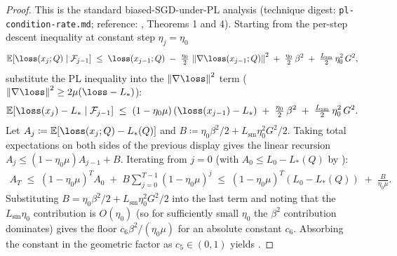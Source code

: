 \begin{proof}
This is the standard biased-SGD-under-PL analysis (technique digest:
\texttt{pl-condition-rate.md}; reference: \cite{karimi2016pl},
Theorems 1 and 4). Starting from the per-step descent inequality
 at constant step $\eta_j = \eta_0$
\begin{align*}
   \E[\loss(x_j; Q) \mid \mathcal F_{j-1}]
   \;\le\;
   \loss(x_{j-1}; Q) \;-\; \tfrac{\eta_0}{2}\, \norm{\nabla \loss(x_{j-1}; Q)}^2
   \;+\; \tfrac{\eta_0}{2}\, \beta^2
   \;+\; \tfrac{L_{\mathrm{sm}}}{2}\, \eta_0^2\, G^2,
\end{align*}
substitute the PL inequality  into the
$\norm{\nabla \loss}^2$ term ($\norm{\nabla \loss}^2 \ge 2 \mu (\loss - L_*)$):
\begin{align*}
   \E[\loss(x_j) - L_* \mid \mathcal F_{j-1}]
   \;\le\;
   (1 - \eta_0 \mu)\, (\loss(x_{j-1}) - L_*)
   \;+\; \tfrac{\eta_0}{2}\, \beta^2
   \;+\; \tfrac{L_{\mathrm{sm}}}{2}\, \eta_0^2\, G^2.
\end{align*}
Let $A_j \coloneqq \E[\loss(x_j; Q) - L_*(Q)]$ and
$B \coloneqq \eta_0 \beta^2 / 2 + L_{\mathrm{sm}} \eta_0^2 G^2 / 2$.
Taking total expectations on both sides of the previous display gives the
linear recursion $A_j \le (1 - \eta_0 \mu) A_{j-1} + B$. Iterating from
$j = 0$ (with $A_0 \le L_0 - L_*(Q)$ by ):
\begin{align*}
   A_T
   \;\le\;
   (1 - \eta_0 \mu)^T A_0
   \;+\; B \sum_{j=0}^{T-1} (1 - \eta_0 \mu)^j
   \;\le\;
   (1 - \eta_0 \mu)^T (L_0 - L_*(Q))
   \;+\; \frac{B}{\eta_0 \mu}.
\end{align*}
Substituting $B = \eta_0 \beta^2 / 2 + L_{\mathrm{sm}} \eta_0^2 G^2 / 2$
into the last term and noting that the $L_{\mathrm{sm}} \eta_0$
contribution is $O(\eta_0)$ (so for sufficiently small $\eta_0$ the
$\beta^2$ contribution dominates) gives the floor
$c_6 \beta^2/(\eta_0 \mu)$ for an absolute constant $c_6$. Absorbing the
constant in the geometric factor as $c_5 \in (0, 1)$ yields
.
\end{proof}

